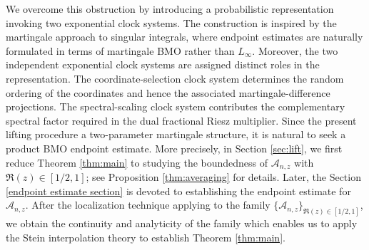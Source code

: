 \documentclass{amsart}
\numberwithin{equation}{section}
\theoremstyle{definition}
\theoremstyle{remark}
\newcommand{\1}{\mathbf 1}
\begin{document}
We overcome this obstruction by introducing a probabilistic representation invoking two exponential clock systems. The construction is inspired by the martingale approach to singular integrals, where endpoint estimates are naturally formulated in terms of martingale BMO rather than $L_\infty$.  Moreover, the two independent exponential clock systems are assigned distinct roles in the representation. The coordinate-selection clock system determines the random ordering of the coordinates and hence the associated martingale-difference projections. The spectral-scaling clock system contributes the complementary spectral factor required in the dual fractional Riesz multiplier. Since
the present lifting procedure a two-parameter martingale structure, it is natural to seek a product BMO endpoint estimate.  More precisely, in Section \ref{sec:lift}, we first reduce Theorem \ref{thm:main} to studying the boundedness of $\mathcal{A}_{n,z}$ with $\Re(z)\in [1/2,1]$; see Proposition \ref{thm:averaging} for details. Later, the Section \ref{endpoint estimate section} is devoted to establishing the endpoint estimate for $\mathcal{A}_{n,z}$. After the localization technique applying to the family $\{\mathcal{A}_{n,z}\}_{\Re(z)\in [1/2,1]}$, we obtain the continuity and analyticity of the family which enables us to apply the Stein interpolation theory to establish Theorem \ref{thm:main}.
\end{document}

